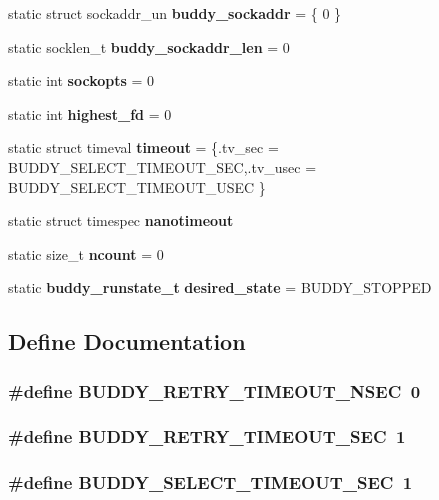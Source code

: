 \begin{DoxyCompactItemize}
$$static struct sockaddr\_\-un {\bf buddy\_\-sockaddr} = \{ 0 \}
\item 
static socklen\_\-t {\bf buddy\_\-sockaddr\_\-len} = 0
\item 
static int {\bf sockopts} = 0
\item 
static int {\bf highest\_\-fd} = 0
\item 
static struct timeval {\bf timeout} = \{.tv\_\-sec = BUDDY\_\-SELECT\_\-TIMEOUT\_\-SEC,.tv\_\-usec = BUDDY\_\-SELECT\_\-TIMEOUT\_\-USEC \}
\item 
static struct timespec {\bf nanotimeout}
\item 
static size\_\-t {\bf ncount} = 0
\item 
static {\bf buddy\_\-runstate\_\-t} {\bf desired\_\-state} = BUDDY\_\-STOPPED
\end{DoxyCompactItemize}


\subsection{Define Documentation}
\subsubsection[{BUDDY\_\-RETRY\_\-TIMEOUT\_\-NSEC}]{\setlength{\rightskip}{0pt plus 5cm}\#define BUDDY\_\-RETRY\_\-TIMEOUT\_\-NSEC~0}\label{buddy_8c_a374adc6ab83d41ad69c660812a5e3854}
\subsubsection[{BUDDY\_\-RETRY\_\-TIMEOUT\_\-SEC}]{\setlength{\rightskip}{0pt plus 5cm}\#define BUDDY\_\-RETRY\_\-TIMEOUT\_\-SEC~1}\label{buddy_8c_a597f1456de2807772248521856a6ca1c}
\subsubsection[{BUDDY\_\-SELECT\_\-TIMEOUT\_\-SEC}]{\setlength{\rightskip}{0pt plus 5cm}\#define BUDDY\_\-SELECT\_\-TIMEOUT\_\-SEC~1}\label{buddy_8c_a626b2fe03c7debfb60486ae00bf30ce1}



